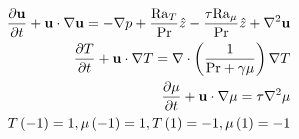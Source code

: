 
\begin{align}
	\frac{\partial \mathbf{u}}{\partial t}+\mathbf{u}\cdot\nabla\mathbf{u}=-\nabla{p}+\frac{\mathrm{Ra}_{T}}{\mathrm{Pr}}\hat{z}-\frac{\tau\mathrm{Ra}_{\mu}}{\mathrm{Pr}}\hat{z}+\nabla^{2}\mathbf{u}\\
	\frac{\partial T}{\partial t}+\mathbf{u}\cdot\nabla{T}=\nabla\cdot\left(\frac{1}{\mathrm{Pr}+\gamma\mu}\right)\nabla{T}\\
	\frac{\partial \mu}{\partial t}+\mathbf{u}\cdot\nabla{\mu}=\tau\nabla^{2}\mu\\
	T\left(-1\right)=1,\mu\left(-1\right)=1,T\left(1\right)=-1,\mu\left(1\right)=-1
\end{align}


